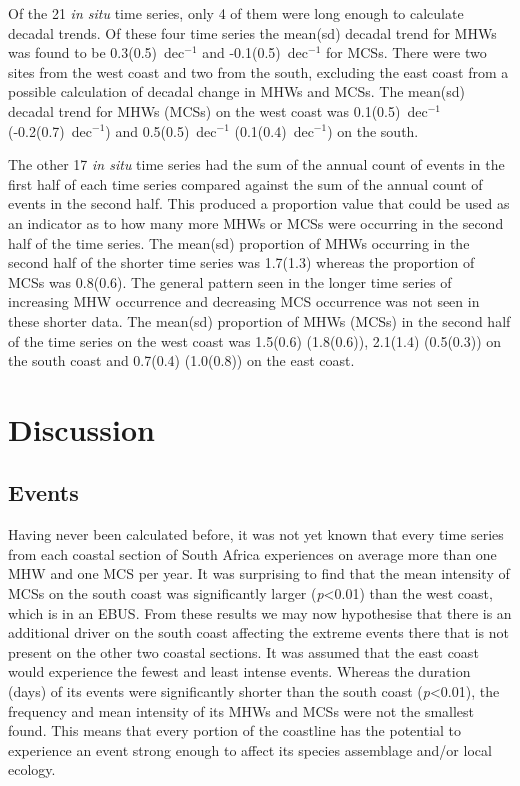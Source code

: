 \documentclass[a4paper,10pt,review]{elsarticle}
\begin{document}
Of the 21 \emph{in situ} time series, only 4 of them were long enough to calculate decadal trends. Of these four time series the mean(sd) decadal trend for MHWs was found to be 0.3(0.5)~dec$^{-1}$ and -0.1(0.5)~dec$^{-1}$ for MCSs. There were two sites from the west coast and two from the south, excluding the east coast from a possible calculation of decadal change in MHWs and MCSs. The mean(sd) decadal trend for MHWs (MCSs) on the west coast was 0.1(0.5)~dec$^{-1}$ (-0.2(0.7)~dec$^{-1}$) and 0.5(0.5)~dec$^{-1}$ (0.1(0.4)~dec$^{-1}$) on the south.

The other 17 \emph{in situ} time series had the sum of the annual count of events in the first half of each time series compared against the sum of the annual count of events in the second half. This produced a proportion value that could be used as an indicator as to how many more MHWs or MCSs were occurring in the second half of the time series. The mean(sd) proportion of MHWs occurring in the second half of the shorter time series was 1.7(1.3) whereas the proportion of MCSs was 0.8(0.6). The general pattern seen in the longer time series of increasing MHW occurrence and decreasing MCS occurrence was not seen in these shorter data. The mean(sd) proportion of MHWs (MCSs) in the second half of the time series on the west coast was 1.5(0.6) (1.8(0.6)), 2.1(1.4) (0.5(0.3)) on the south coast and 0.7(0.4) (1.0(0.8)) on the east coast.

\section{Discussion}

\subsection{Events}
Having never been calculated before, it was not yet known that every time series from each coastal section of South Africa experiences on average more than one MHW and one MCS per year. It was surprising to find that the mean intensity of MCSs on the south coast was significantly larger (\emph{p}<0.01) than the west coast, which is in an EBUS. From these results we may now hypothesise that there is an additional driver on the south coast affecting the extreme events there that is not present on the other two coastal sections. It was assumed that the east coast would experience the fewest and least intense events. Whereas the duration (days) of its events were significantly shorter than the south coast (\emph{p}<0.01), the frequency and mean intensity of its MHWs and MCSs were not the smallest found. This means that every portion of the coastline has the potential to experience an event strong enough to affect its species assemblage and/or local ecology.
\end{document}

